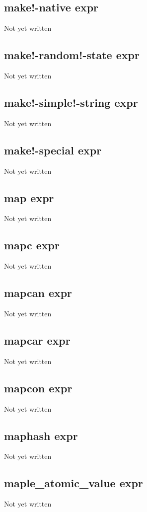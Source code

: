 \documentclass[a4paper,11pt]{article}
\begin{document}
{\subsection{\ttfamily make!-native expr}
   Not yet written

\subsection{\ttfamily make!-random!-state expr}
   Not yet written

\subsection{\ttfamily make!-simple!-string expr}
   Not yet written

\subsection{\ttfamily make!-special expr}
   Not yet written

\subsection{\ttfamily map expr}
   Not yet written

\subsection{\ttfamily mapc expr}
   Not yet written

\subsection{\ttfamily mapcan expr}
   Not yet written

\subsection{\ttfamily mapcar expr}
   Not yet written

\subsection{\ttfamily mapcon expr}
   Not yet written

\subsection{\ttfamily maphash expr}
   Not yet written

\subsection{\ttfamily maple\_atomic\_value expr}
   Not yet written

}
\end{document}
